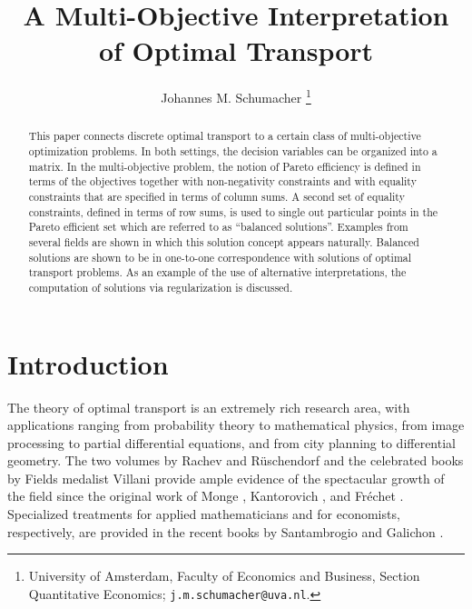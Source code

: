\documentclass{article}
\theoremstyle{definition}
\begin{document}
\title{A Multi-Objective Interpretation of Optimal Transport}

\author{%
Johannes M. Schumacher%
\thanks{\baselineskip12pt University of Amsterdam, Faculty of Economics and Business, Section Quantitative Economics;
{\tt j.m.schumacher@uva.nl}.}}

\maketitle
\begin{abstract}
\noindent
This paper connects discrete optimal transport to a certain class of multi-objective optimization problems. In both settings, the decision variables can be organized into a matrix. In the multi-objective problem, the notion of Pareto efficiency is defined in terms of the objectives together with non-negativity constraints and with equality constraints that are specified in terms of column sums. A second set of equality constraints, defined in terms of row sums, is used to single out particular points in the Pareto efficient set which are referred to as ``balanced solutions''\!. Examples from several fields are shown in which this solution concept appears naturally. Balanced solutions are shown to be in one-to-one correspondence with solutions of optimal transport problems. As an example of the use of alternative interpretations, the computation of solutions via regularization is discussed.
\end{abstract}

\section{Introduction} \label{introduction}

The theory of optimal transport is an extremely rich research area, with applications ranging from probability theory to mathematical physics, from image processing to partial differential equations, and from city planning to differential geometry. The two volumes by Rachev and R\"{u}schendorf \cite{Rachev1,Rachev2} and the celebrated books by Fields medalist Villani \cite{Villani03,Villani} provide ample evidence of the spectacular growth of the field since the original work of Monge \cite{Monge}, Kantorovich \cite{Kantorovich}, and Fr\'echet \cite{Frechet}. Specialized treatments for applied mathematicians and for economists, respectively, are provided in the
recent books by Santambrogio \cite{Santambrogio} and Galichon \cite{Galichon}.
\end{document}
